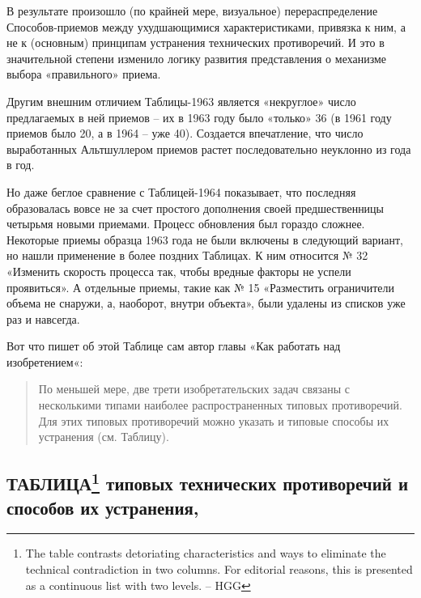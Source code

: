 \documentclass[11pt,a4paper]{article}
\begin{document}
В результате произошло (по крайней мере, визуальное) перераспределение
Способов-приемов между ухудшающимися характеристиками, привязка к ним, а не к
(основным) принципам устранения технических противоречий. И это в значительной
степени изменило логику развития представления о механизме выбора
«правильного» приема.

Другим внешним отличием Таблицы-1963 является «некруглое» число предлагаемых в
ней приемов -- их в 1963 году было «только» 36 (в 1961 году приемов было 20, а
в 1964 -- уже 40). Создается впечатление, что число выработанных Альтшуллером
приемов растет последовательно неуклонно из года в год.

Но даже беглое сравнение с Таблицей-1964 показывает, что последняя
образовалась вовсе не за счет простого дополнения своей предшественницы
четырьмя новыми приемами. Процесс обновления был гораздо сложнее. Некоторые
приемы образца 1963 года не были включены в следующий вариант, но нашли
применение в более поздних Таблицах. К ним относится № 32 «Изменить скорость
процесса так, чтобы вредные факторы не успели проявиться». А отдельные приемы,
такие как № 15 «Разместить ограничители объема не снаружи, а, наоборот, внутри
объекта», были удалены из списков уже раз и навсегда.

Вот что пишет об этой Таблице сам автор главы «Как работать над изобретением«:
\begin{quote}
  По меньшей мере, две трети изобретательских задач связаны с несколькими
  типами наиболее распространенных типовых противоречий. Для этих типовых
  противоречий можно указать и типовые способы их устранения
  (см. Таблицу).
\end{quote}

\subsection*{ТАБЛИЦА\footnote{The table contrasts detoriating characteristics
    and ways to eliminate the technical contradiction in two columns. For
    editorial reasons, this is presented as a continuous list with two
    levels. -- HGG} типовых технических противоречий и способов их устранения,
  \cite{Altshuller1963}}
\end{document}
